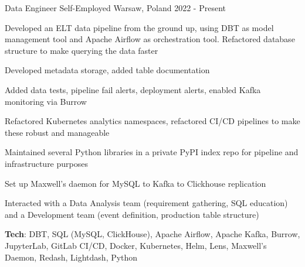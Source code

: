 

\begin{cventries}

  \cventry
    {Data Engineer} %
    {Self-Employed} %
    {Warsaw, Poland} %
    {2022 - Present} %
    {
      \begin{cvitems} %
        \item {Developed an ELT data pipeline from the ground up, using DBT as model management tool and Apache Airflow as orchestration tool. Refactored database structure to make querying the data faster}
        \item {Developed metadata storage, added table documentation}
        \item {Added data tests, pipeline fail alerts, deployment alerts, enabled Kafka monitoring via Burrow}
        \item {Refactored Kubernetes analytics namespaces, refactored CI/CD pipelines to make these robust and manageable}
        \item {Maintained several Python libraries in a private PyPI index repo for pipeline and infrastructure purposes}
        \item {Set up Maxwell's daemon for MySQL to Kafka to Clickhouse replication}
        \item {Interacted with a Data Analysis team (requirement gathering, SQL education) and a Development team (event definition, production table structure) }
        \item {{\color{awesome-skyblue} \bf Tech}: DBT, SQL (MySQL, ClickHouse), Apache Airflow, Apache Kafka, Burrow, JupyterLab, GitLab CI/CD, Docker, Kubernetes, Helm, Lens, Maxwell's Daemon, Redash, Lightdash, Python}
      \end{cvitems}
    }


\end{cventries}
